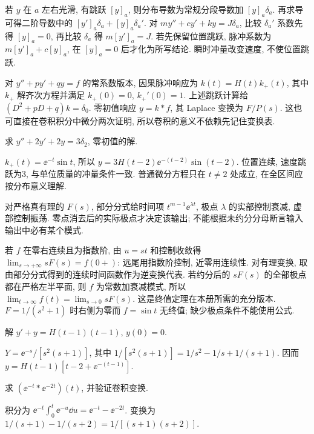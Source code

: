若 $y$ 在 $a$ 左右光滑, 有跳跃 $[y]_a$, 则分布导数为常规分段导数加 $[y]_a\delta_a$. 再求导可得二阶导数中的 $[y']_a\delta_a+[y]_a\delta_a'$. 对 $my''+cy'+ky=J\delta_a$, 比较 $\delta_a'$ 系数先得 $[y]_a=0$, 再比较 $\delta_a$ 得 $m[y']_a=J$. 若先保留位置跳跃, 脉冲系数为 $m[y']_a+c[y]_a$, 在 $[y]_a=0$ 后才化为所写结论. 瞬时冲量改变速度, 不使位置跳跃.

对 $y''+py'+qy=f$ 的常系数版本, 因果脉冲响应为 $k(t)=H(t)k_+(t)$, 其中 $k_+$ 解齐次方程并满足 $k_+(0)=0$, $k_+'(0)=1$. 上述跳跃计算给 $(D^2+pD+q)k=\delta_0$. 零初值响应 $y=k*f$, 其 Laplace 变换为 $F/P(s)$. 这也可直接在卷积积分中微分两次证明, 所以卷积的意义不依赖先记住变换表.
\begin{example}求 $y''+2y'+2y=3\delta_2$, 零初值的解.\end{example}
\begin{solution}
$k_+(t)=\ee^{-t}\sin t$, 所以 $y=3H(t-2)\ee^{-(t-2)}\sin(t-2)$. 位置连续, 速度跳跃为3, 与单位质量的冲量条件一致. 普通微分方程只在 $t\ne2$ 处成立, 在全区间应按分布意义理解.
\end{solution}
对严格真有理的 $F(s)$, 部分分式给时间项 $t^{m-1}\ee^{\lambda t}$, 极点 $\lambda$ 的实部控制衰减, 虚部控制振荡. 零点消去后的实际极点才决定该输出; 不能根据未约分分母断言输入输出中必有某个模式.

若 $f$ 在零右连续且为指数阶, 由 $u=st$ 和控制收敛得 $\lim_{s\to+\infty}sF(s)=f(0+)$: 远尾用指数阶控制, 近零用连续性. 对有理变换, 取由部分分式得到的连续时间函数作为逆变换代表. 若约分后的 $sF(s)$ 的全部极点都在严格左半平面, 则 $f$ 为常数加衰减模式, 所以 $\lim_{t\to\infty}f(t)=\lim_{s\to0}sF(s)$. 这是终值定理在本册所需的充分版本. $F=1/(s^2+1)$ 时右侧为零而 $f=\sin t$ 无终值; 缺少极点条件不能使用公式.
\begin{exercise}解 $y'+y=H(t-1)(t-1)$, $y(0)=0$.\end{exercise}
\begin{solution}$Y=\ee^{-s}/[s^2(s+1)]$, 其中 $1/[s^2(s+1)]=1/s^2-1/s+1/(s+1)$. 因而 $y=H(t-1)[t-2+\ee^{-(t-1)}]$.\end{solution}
\begin{exercise}求 $(\ee^{-t}*\ee^{-2t})(t)$, 并验证卷积变换.\end{exercise}
\begin{solution}积分为 $\ee^{-t}\int_0^t\ee^{-u}\dd u=\ee^{-t}-\ee^{-2t}$. 变换为 $1/(s+1)-1/(s+2)=1/[(s+1)(s+2)]$.\end{solution}
